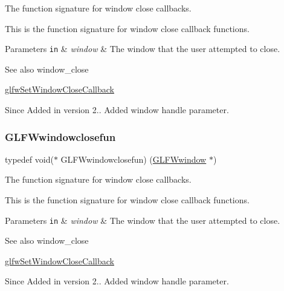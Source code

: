 The function signature for window close callbacks. 

This is the function signature for window close callback functions.


\begin{DoxyParams}[1]{Parameters}
\mbox{\tt in}  & {\em window} & The window that the user attempted to close.\\
\hline
\end{DoxyParams}
\begin{DoxySeeAlso}{See also}
window\+\_\+close 

\hyperlink{group__window_ga5b827da350141c789acd64f5c4f7a0e1}{glfw\+Set\+Window\+Close\+Callback}
\end{DoxySeeAlso}
\begin{DoxySince}{Since}
Added in version 2..  Added window handle parameter. 
\end{DoxySince}
\mbox{\label{group__window_ga93e7c2555bd837f4ed8b20f76cada72e}} 
\subsubsection{\texorpdfstring{G\+L\+F\+Wwindowclosefun}{GLFWwindowclosefun}\hspace{0.1cm}{\footnotesize\ttfamily [3/5]}}
{\footnotesize\ttfamily typedef void($\ast$  G\+L\+F\+Wwindowclosefun) (\hyperlink{group__window_ga3c96d80d363e67d13a41b5d1821f3242}{G\+L\+F\+Wwindow} $\ast$)}



The function signature for window close callbacks. 

This is the function signature for window close callback functions.


\begin{DoxyParams}[1]{Parameters}
\mbox{\tt in}  & {\em window} & The window that the user attempted to close.\\
\hline
\end{DoxyParams}
\begin{DoxySeeAlso}{See also}
window\+\_\+close 

\hyperlink{group__window_ga5b827da350141c789acd64f5c4f7a0e1}{glfw\+Set\+Window\+Close\+Callback}
\end{DoxySeeAlso}
\begin{DoxySince}{Since}
Added in version 2..  Added window handle parameter. 
\end{DoxySince}
\mbox{\label{group__window_ga93e7c2555bd837f4ed8b20f76cada72e}} 
